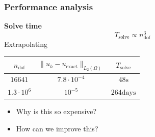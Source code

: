 \documentclass{beamer}
\begin{document}
\begin{frame}[fragile]
  \frametitle{Performance analysis}
  \textbf{Solve time}\\[1ex]
  $$
  T_{\text{solve}}\propto n_{\text{dof}}^3
  $$
  Extrapolating
  \begin{center}
    \renewcommand{\arraystretch}{1.5}
    \begin{tabular}{ccc}
      \hline
      $n_{\text{dof}}$ & $\|u_h-u_{\text{exact}}\|_{L_2(\Omega)}$ & $T_{\text{solve}}$\\\hline\hline
      $16641$ & $7.8\cdot 10^{-4}$ & $48\text{s}$\\
      $1.3\cdot 10^6$ & $10^{-5}$ & $264\text{days}$\\
      \hline
    \end{tabular}
  \end{center}
  \begin{itemize}
  \item Why is this so expensive?
  \item How can we improve this?
  \end{itemize}
\end{frame}

\end{document}
